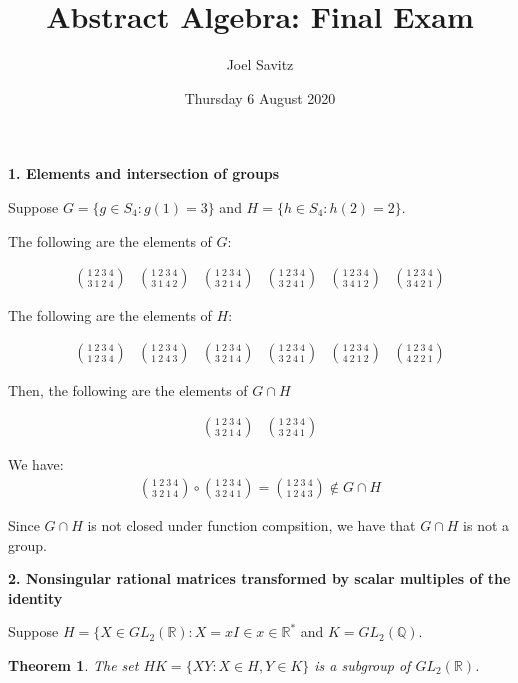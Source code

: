 \documentclass[12pt]{article}
\title{Abstract Algebra: Final Exam}
\author{Joel Savitz}
\date{Thursday 6 August 2020}
\newcommand{\reals}{\mathbb{R}}
\newcommand{\rats}{\mathbb{Q}}
\newcommand{\gltwo}{GL_2(\reals)}
\newcommand{\gltwoq}{GL_2(\rats)}
\newtheorem{thm}{Theorem}
\begin{document}
\maketitle

\textbf{1. Elements and intersection of groups}

Suppose $G = \{ g \in S_4: g(1) = 3 \}$ and $H = \{ h \in S_4: h(2) = 2 \}$.

The following are the elements of $G$:

\begin{align}
	\binom{1\ 2\ 3\ 4}{3\ 1\ 2\ 4} &
	\binom{1\ 2\ 3\ 4}{3\ 1\ 4\ 2} &
	\binom{1\ 2\ 3\ 4}{3\ 2\ 1\ 4} &
	\binom{1\ 2\ 3\ 4}{3\ 2\ 4\ 1} &
	\binom{1\ 2\ 3\ 4}{3\ 4\ 1\ 2} &
	\binom{1\ 2\ 3\ 4}{3\ 4\ 2\ 1}
\end{align}

The following are the elements of $H$:

\begin{align}
	\binom{1\ 2\ 3\ 4}{1\ 2\ 3\ 4} &
	\binom{1\ 2\ 3\ 4}{1\ 2\ 4\ 3} &
	\binom{1\ 2\ 3\ 4}{3\ 2\ 1\ 4} &
	\binom{1\ 2\ 3\ 4}{3\ 2\ 4\ 1} &
	\binom{1\ 2\ 3\ 4}{4\ 2\ 1\ 2} &
	\binom{1\ 2\ 3\ 4}{4\ 2\ 2\ 1}
\end{align}

Then, the following are the elements of $G \cap H$

\begin{align}
	\binom{1\ 2\ 3\ 4}{3\ 2\ 1\ 4} &
	\binom{1\ 2\ 3\ 4}{3\ 2\ 4\ 1}
\end{align}

We have: 
\begin{align}
	\binom{1\ 2\ 3\ 4}{3\ 2\ 1\ 4} \circ \binom{1\ 2\ 3\ 4}{3\ 2\ 4\ 1}
	= \binom{1\ 2\ 3\ 4}{1\ 2\ 4\ 3} \not\in G \cap H
\end{align}

Since $G \cap H$ is not closed under function compsition,
we have that $G \cap H$ is not a group.

\textbf{2. Nonsingular rational matrices transformed by scalar multiples of the identity}

Suppose $H = \{ X \in \gltwo: X = xI \in x \in \reals^*$ and $K = \gltwoq$.

\begin{thm}
	The set $HK = \{ XY: X \in H, Y \in K \}$ is a subgroup of $\gltwo$.
\end{thm}
\end{document}
